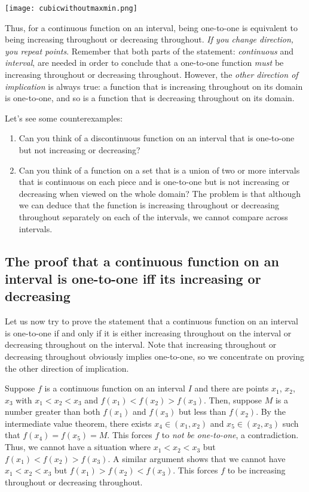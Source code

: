 \documentclass[10pt]{amsart}
\begin{document}
\texttt{[image: cubicwithoutmaxmin.png]}

Thus, for a continuous function on an interval, being one-to-one is
equivalent to being increasing throughout or decreasing
throughout. {\em If you change direction, you repeat points}. Remember
that both parts of the statement: {\em continuous} and {\em interval},
are needed in order to conclude that a one-to-one function {\em must}
be increasing throughout or decreasing throughout. However, the {\em
other direction of implication} is always true: a function that is
increasing throughout on its domain is one-to-one, and so is a
function that is decreasing throughout on its domain.

Let's see some counterexamples:

\begin{enumerate}
\item Can you think of a discontinuous function on an interval that is
  one-to-one but not increasing or decreasing?
\item Can you think of a function on a set that is a union of two or
  more intervals that is continuous on each piece and is one-to-one
  but is not increasing or decreasing when viewed on the whole domain?
  The problem is that although we can deduce that the function is
  increasing throughout or decreasing throughout separately on each of
  the intervals, we cannot compare across intervals.
\end{enumerate}

\subsection{The proof that a continuous function on an interval is one-to-one iff its increasing or decreasing}

Let us now try to prove the statement that a continuous function on an
interval is one-to-one if and only if it is either increasing
throughout on the interval or decreasing throughout on the
interval. Note that increasing throughout or decreasing throughout
obviously implies one-to-one, so we concentrate on proving the other
direction of implication.

Suppose $f$ is a continuous function on an interval $I$ and there are
points $x_1$, $x_2$, $x_3$ with $x_1 < x_2 < x_3$ and $f(x_1) < f(x_2)
> f(x_3)$. Then, suppose $M$ is a number greater than both $f(x_1)$
and $f(x_3)$ but less than $f(x_2)$. By the intermediate value
theorem, there exists $x_4 \in (x_1,x_2)$ and $x_5 \in (x_2,x_3)$ such
that $f(x_4) = f(x_5) = M$. This forces $f$ to {\em not be
one-to-one}, a contradiction. Thus, we cannot have a situation where
$x_1 < x_2 < x_3$ but $f(x_1) < f(x_2) > f(x_3)$. A similar argument
shows that we cannot have $x_1 < x_2 < x_3$ but $f(x_1) > f(x_2) <
f(x_3)$. This forces $f$ to be increasing throughout or decreasing
throughout.
\end{document}
